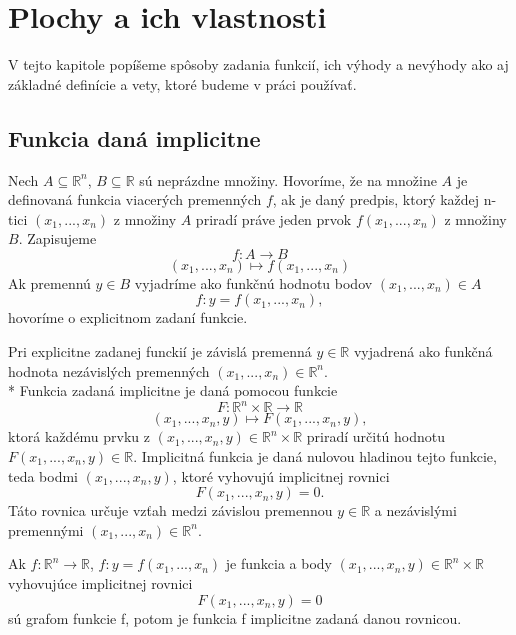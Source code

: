 \chapter{Plochy a ich vlastnosti}

\label{kap:plochy} %

V tejto kapitole popíšeme spôsoby zadania funkcií, ich výhody a nevýhody
ako aj základné definície a vety, ktoré budeme v práci používať.

\section{Funkcia daná implicitne}

\begin{definition}
    Nech $A \subseteq \mathbb{R}^n$, $B \subseteq \mathbb{R}$ sú neprázdne množiny. 
Hovoríme, že na množine $A$ je definovaná funkcia viacerých premenných
$f$, ak je daný predpis, ktorý každej n-tici $(x_1, . . . , x_n)$
z množiny $A$ priradí práve jeden prvok $f(x_1, . . . , x_n)$ z množiny $B$.
Zapisujeme 
$$f : A \to B$$
$$(x_1, . . . , x_n) \mapsto f(x_1, . . . , x_n)$$
Ak premennú $y \in B$ vyjadríme ako funkčnú hodnotu bodov $(x_1, . . . , x_n) \in A$
$$f : y = f(x_1, . . . , x_n),$$
hovoríme o explicitnom zadaní funkcie.
\end{definition}


Pri explicitne zadanej funckií je závislá premenná $y \in \mathbb{R}$ vyjadrená ako funkčná hodnota nezávislých
premenných $(x_1, . . . , x_n) \in \mathbb{R}^n$.
\\*
Funkcia zadaná implicitne je daná pomocou funkcie $$F : \mathbb{R}^n \times \mathbb{R} \to \mathbb{R}$$
$$(x_1, . . . ,x_n, y) \mapsto F(x_1, . . . , x_n, y),$$ ktorá každému prvku z $(x_1, . . . ,x_n, y) \in \mathbb{R}^{n} \times \mathbb{R}$ 
priradí určitú hodnotu $F(x_1, . . . , x_n, y) \in \mathbb{R}$. 
Implicitná funkcia je daná nulovou hladinou tejto funkcie, teda bodmi $(x_1, . . . , x_n, y)$, 
ktoré vyhovujú implicitnej rovnici $$F(x_1, . . . , x_n, y) = 0.$$  
Táto rovnica určuje vzťah medzi závislou premennou $y \in \mathbb{R}$
a nezávislými premennými $(x_1, . . . , x_n) \in \mathbb{R}^n$. 

\begin{note}
    Ak $f : \mathbb{R}^n \to \mathbb{R}$, $f: y = f(x_1, . . . , x_n)$ je funkcia a body
    $(x_1, . . . , x_n, y) \in \mathbb{R}^n \times \mathbb{R}$ vyhovujúce implicitnej rovnici 
    $$F(x_1, . . . , x_n, y) = 0$$
    sú grafom funkcie f,
    potom je funkcia f implicitne zadaná danou rovnicou.
\end{note}

